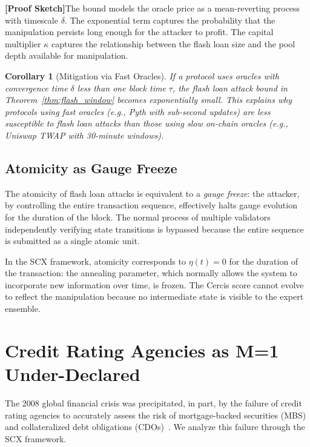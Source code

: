 \documentclass[12pt,a4paper]{article}
\newtheorem{corollary}[theorem]{Corollary}
\theoremstyle{remark}
\newcommand{\Cercis}{\textsf{Cercis}}
\newcommand{\rigorSketch}{\textbf{[Proof Sketch]}}
\begin{document}
\rigorSketch The bound models the oracle price as a mean-reverting process
with timescale $\delta$. The exponential term captures the probability that
the manipulation persists long enough for the attacker to profit. The capital
multiplier $\kappa$ captures the relationship between the flash loan size and
the pool depth available for manipulation.

\begin{corollary}[Mitigation via Fast Oracles]
\label{cor:flash}
If a protocol uses oracles with convergence time $\delta$ less than one block
time $\tau$, the flash loan attack bound in
Theorem~\ref{thm:flash_window} becomes exponentially small. This explains why
protocols using fast oracles (e.g., Pyth with sub-second updates) are less
susceptible to flash loan attacks than those using slow on-chain oracles (e.g.,
Uniswap TWAP with 30-minute windows).
\end{corollary}

\subsection{Atomicity as Gauge Freeze}

The atomicity of flash loan attacks is equivalent to a \emph{gauge freeze}:
the attacker, by controlling the entire transaction sequence, effectively
halts gauge evolution for the duration of the block. The normal process of
multiple validators independently verifying state transitions is bypassed
because the entire sequence is submitted as a single atomic unit.

In the SCX framework, atomicity corresponds to $\eta(t) = 0$ for the duration
of the transaction: the annealing parameter, which normally allows the system
to incorporate new information over time, is frozen. The \Cercis{} score
cannot evolve to reflect the manipulation because no intermediate state is
visible to the expert ensemble.

\section{Credit Rating Agencies as M=1 Under-Declared}
\label{sec:credit}

The 2008 global financial crisis was precipitated, in part, by the failure of
credit rating agencies to accurately assess the risk of mortgage-backed
securities (MBS) and collateralized debt obligations
(CDOs)~\cite{white2010credit}. We analyze this failure through the SCX
framework.
\end{document}
